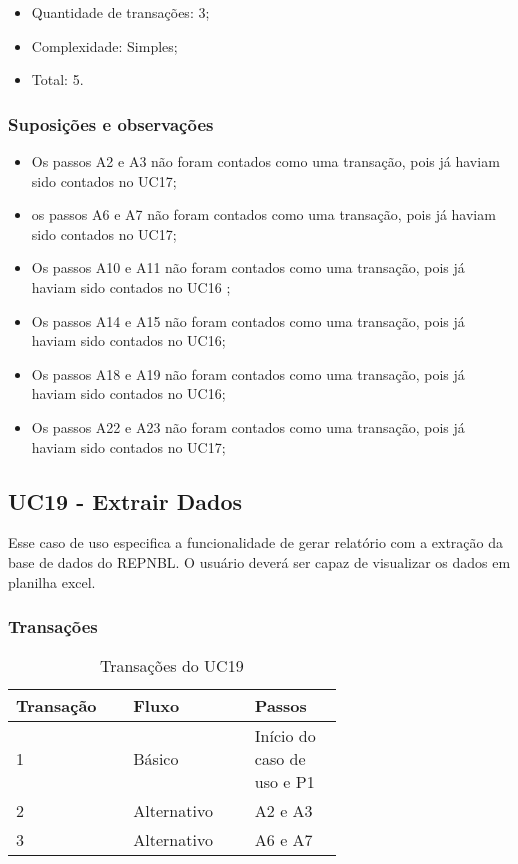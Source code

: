   \begin{itemize}
  \item Quantidade de transações: 3;
  \item Complexidade: Simples;
  \item Total: 5.
  \end{itemize}
  
  \subsubsection{Suposições e observações}
  
  \begin{itemize}
   \item Os passos A2 e A3 não foram contados como uma transação, pois já haviam sido contados no UC17;	
   \item os passos A6 e A7 não foram contados como uma transação, pois já haviam sido contados no UC17;	
   \item Os passos A10 e A11 não foram contados como uma transação, pois já haviam sido contados no UC16	;
   \item Os passos A14 e A15 não foram contados como uma transação, pois já haviam sido contados no UC16;	
   \item Os passos A18 e A19 não foram contados como uma transação, pois já haviam sido contados no UC16;
   \item Os passos A22 e A23 não foram contados como uma transação, pois já haviam sido contados no UC17;
  \end{itemize}
  
  \vfill
  
  
  
\pagebreak
\subsection{UC19 - Extrair Dados}
  
  Esse caso de uso especifica a funcionalidade de gerar relatório com a extração da base de dados do REPNBL. 
  O usuário deverá ser capaz de visualizar os dados em planilha excel.

  \subsubsection{Transações}

  \begin{table*}[!h]
  \centering
  \caption{Transações do UC19}
  \label{uc17_transactions}
    \begin{tabular}{|p{0.20\linewidth}|p{0.25\linewidth}|p{0.20\linewidth}|}
    \hline
    \textbf{Transação} & \textbf{Fluxo} & \textbf{Passos} \\ 
    \hline
    1 & Básico & Início do caso de uso e P1\\
    \hline
    2 & Alternativo & A2 e A3\\
    \hline
    3 & Alternativo & A6 e A7\\
    \hline
    \end{tabular}
  \end{table*}

